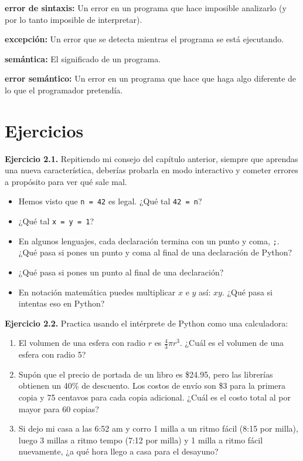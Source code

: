 \documentclass[12pt,letterpaper]{book}
\begin{document}
\textbf{error de sintaxis:} Un error en un programa que hace imposible analizarlo (y por lo tanto imposible de interpretar).

\textbf{excepción:} Un error que se detecta mientras el programa se está ejecutando.

\textbf{semántica:} El significado de un programa.

\textbf{error semántico:} Un error en un programa que hace que haga algo diferente de lo que el programador pretendía.

\section{Ejercicios}

\textbf{Ejercicio 2.1.} Repitiendo mi consejo del capítulo anterior, siempre que aprendas una nueva característica, deberías probarla en modo interactivo y cometer errores a propósito para ver qué sale mal.

\begin{itemize}
\item Hemos visto que \texttt{n = 42} es legal. ¿Qué tal \texttt{42 = n}?
\item ¿Qué tal \texttt{x = y = 1}?
\item En algunos lenguajes, cada declaración termina con un punto y coma, \texttt{;}. ¿Qué pasa si pones un punto y coma al final de una declaración de Python?
\item ¿Qué pasa si pones un punto al final de una declaración?
\item En notación matemática puedes multiplicar $x$ e $y$ así: $xy$. ¿Qué pasa si intentas eso en Python?
\end{itemize}

\textbf{Ejercicio 2.2.} Practica usando el intérprete de Python como una calculadora:

\begin{enumerate}
\item El volumen de una esfera con radio $r$ es $\frac{4}{3}\pi r^3$. ¿Cuál es el volumen de una esfera con radio 5?

\item Supón que el precio de portada de un libro es \$24.95, pero las librerías obtienen un 40\% de descuento. Los costos de envío son \$3 para la primera copia y 75 centavos para cada copia adicional. ¿Cuál es el costo total al por mayor para 60 copias?

\item Si dejo mi casa a las 6:52 am y corro 1 milla a un ritmo fácil (8:15 por milla), luego 3 millas a ritmo tempo (7:12 por milla) y 1 milla a ritmo fácil nuevamente, ¿a qué hora llego a casa para el desayuno?
\end{enumerate}
\end{document}
